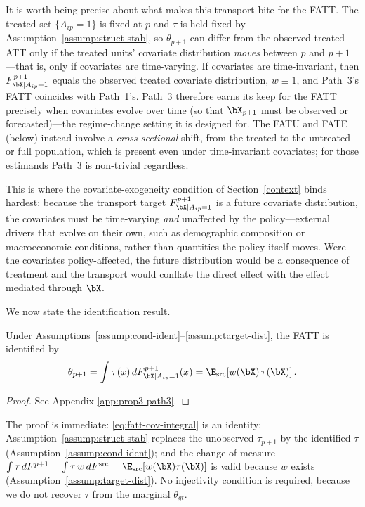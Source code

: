 \documentclass{article}
\begin{document}
It is worth being precise about what makes this transport bite for the FATT. The treated set $\{A_{ip}=1\}$ is fixed at $p$ and $\tau$ is held fixed by Assumption~\ref{assump:struct-stab}, so $\theta_{p+1}$ can differ from the observed treated ATT only if the treated units' covariate distribution \emph{moves} between $p$ and $p+1$---that is, only if covariates are time-varying. If covariates are time-invariant, then $F_{\bX|A_{ip}=1}^{p+1}$ equals the observed treated covariate distribution, $w \equiv 1$, and Path~3's FATT coincides with Path~1's. Path~3 therefore earns its keep for the FATT precisely when covariates evolve over time (so that $\bX_{p+1}$ must be observed or forecasted)---the regime-change setting it is designed for. The FATU and FATE (below) instead involve a \emph{cross-sectional} shift, from the treated to the untreated or full population, which is present even under time-invariant covariates; for those estimands Path~3 is non-trivial regardless.

This is where the covariate-exogeneity condition of Section~\ref{context} binds hardest: because the transport target $F_{\bX|A_{ip}=1}^{p+1}$ is a future covariate distribution, the covariates must be time-varying \emph{and} unaffected by the policy---external drivers that evolve on their own, such as demographic composition or macroeconomic conditions, rather than quantities the policy itself moves. Were the covariates policy-affected, the future distribution would be a consequence of treatment and the transport would conflate the direct effect with the effect mediated through $\bX$.

We now state the identification result.

\begin{proposition}\label{prop:path3}
Under Assumptions~\ref{assump:cond-ident}--\ref{assump:target-dist}, the FATT is identified by
\begin{align*}
    \theta_{p+1} = \int \tau(x) \, dF_{\bX | A_{ip}=1}^{p+1}(x) = \E_{\mathrm{src}}\!\left[ w(\bX)\, \tau(\bX) \right].
\end{align*}
\end{proposition}

\begin{proof}
See Appendix \ref{app:prop3-path3}.
\end{proof}

\noindent The proof is immediate: \eqref{eq:fatt-cov-integral} is an identity; Assumption~\ref{assump:struct-stab} replaces the unobserved $\tau_{p+1}$ by the identified $\tau$ (Assumption~\ref{assump:cond-ident}); and the change of measure $\int \tau \, dF^{p+1} = \int \tau\, w\, dF^{\mathrm{src}} = \E_{\mathrm{src}}[w(\bX)\tau(\bX)]$ is valid because $w$ exists (Assumption~\ref{assump:target-dist}). No injectivity condition is required, because we do not recover $\tau$ from the marginal $\theta_{gt}$.
\end{document}
